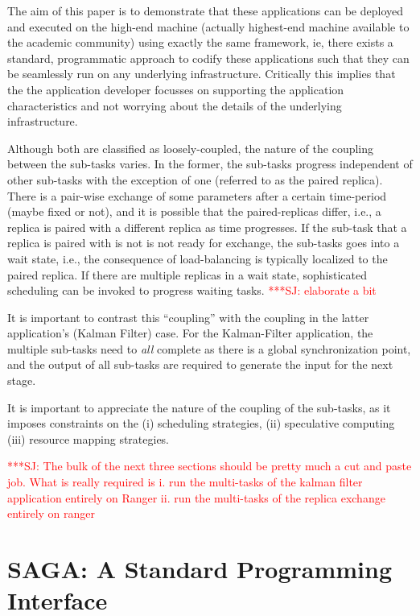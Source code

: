 \documentclass[conference,final]{IEEEtran}
\newcommand{\jhanote}[1]{ {\textcolor{red} { ***SJ: #1 }}}
\newcommand{\jhanote}[1]{}
\begin{document}
The aim of this paper is to demonstrate that these applications can be
deployed and executed on the high-end machine (actually highest-end
machine available to the academic community) using exactly the same
framework, ie, there exists a standard, programmatic approach to
codify these applications such that they can be seamlessly run on any
underlying infrastructure. Critically this implies that the the
application developer focusses on supporting the application
characteristics and not worrying about the details of the underlying
infrastructure.

Although both are classified as loosely-coupled, the nature of the
coupling between the sub-tasks varies. In the former, the sub-tasks
progress independent of other sub-tasks with the exception of one
(referred to as the paired replica). There is a pair-wise exchange of
some parameters after a certain time-period (maybe fixed or not), and
it is possible that the paired-replicas differ, i.e., a replica is
paired with a different replica as time progresses. If the sub-task
that a replica is paired with is not is not ready for exchange, the
sub-tasks goes into a wait state, i.e., the consequence of
load-balancing is typically localized to the paired replica. If there
are multiple replicas in a wait state, sophisticated scheduling can be
invoked to progress waiting tasks. \jhanote{elaborate a bit}

It is important to contrast this ``coupling'' with the coupling in the
latter application's (Kalman Filter) case. For the Kalman-Filter
application, the multiple sub-tasks need to {\it all} complete
as there is a global synchronization point, and the output
of all sub-tasks are required to generate the input for the next
stage.

It is important to appreciate the nature of the coupling of
the sub-tasks, as it imposes constraints on the 
(i) scheduling strategies, (ii) speculative computing (iii) resource
mapping strategies.


\jhanote{The bulk of the next three sections should be pretty much 
  a cut and paste job. What is really required is i. run the
  multi-tasks of the kalman filter  application entirely on Ranger
  ii. run the multi-tasks of the replica exchange entirely on 
  ranger}

\section{SAGA: A Standard Programming Interface}
\end{document}
